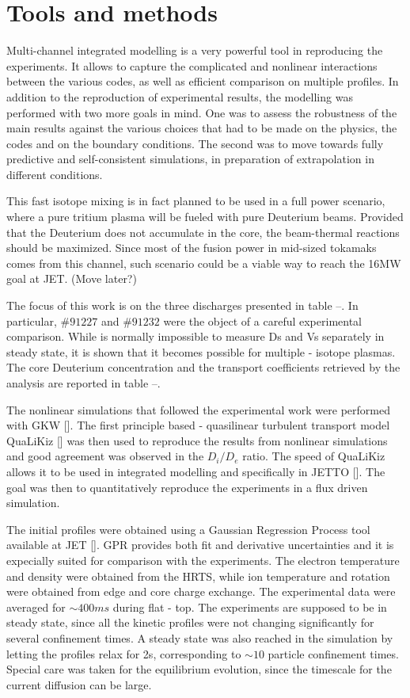 \documentclass[a4paper,10pt]{iopart}
\begin{document}
\section{Tools and methods}

Multi-channel integrated modelling is a very powerful tool in reproducing the experiments. It allows to capture the complicated and nonlinear interactions between the various codes, as well as efficient comparison on multiple profiles. In addition to the reproduction of experimental results, the modelling was performed with two more goals in mind. One was to assess the robustness of the main results against the various choices that had to be made on the physics, the codes and on the boundary conditions. The second was to move towards fully predictive and self-consistent simulations, in preparation of extrapolation in different conditions.

This fast isotope mixing is in fact planned to be used in a full power scenario, where a pure tritium plasma will be fueled with pure Deuterium beams. Provided that the Deuterium does not accumulate in the core, the beam-thermal reactions should be maximized. Since most of the fusion power in mid-sized tokamaks comes from this channel, such scenario could be a viable way to reach the 16MW goal at JET. (Move later?)

The focus of this work is on the three discharges presented in table --. In particular, $\#91227$ and $\#91232$ were the object of a careful experimental comparison. While is normally impossible to measure Ds and Vs separately in steady state, it is shown that it becomes possible for multiple - isotope plasmas. The core Deuterium concentration and the transport coefficients retrieved by the analysis are reported in table --. 

The nonlinear simulations that followed the experimental work were performed with GKW []. The first principle based - quasilinear turbulent transport model QuaLiKiz [] was then used to reproduce the results from nonlinear simulations and good agreement was observed in the $D_{i}/D_{e} $ ratio. The speed of QuaLiKiz allows it to be used in integrated modelling and specifically in JETTO []. The goal was then to quantitatively reproduce the experiments in a flux driven simulation. 

The initial profiles were obtained using a Gaussian Regression Process tool available at JET []. GPR provides both fit and derivative uncertainties and it is expecially suited for comparison with the experiments. The electron temperature and density were obtained from the HRTS, while ion temperature and rotation were obtained from edge and core charge exchange. The experimental data were averaged for $ \sim 400 ms $ during flat - top.  The experiments are supposed to be in steady state, since all the kinetic profiles were not changing significantly for several confinement times. A steady state was also reached in the simulation by letting the profiles relax for 2s, corresponding to $ \sim 10 $ particle confinement times. Special care was taken for the equilibrium evolution, since the timescale for the current diffusion can be large.
\end{document}
